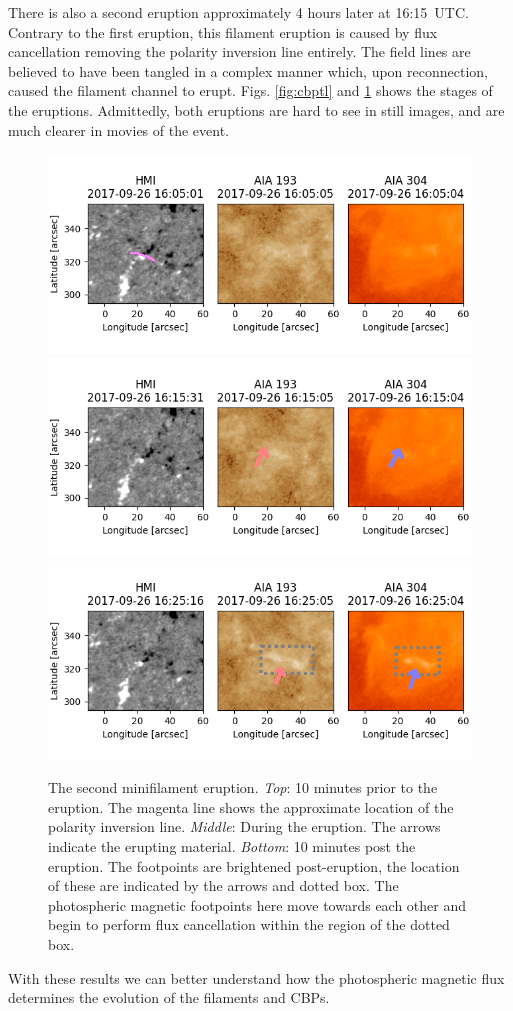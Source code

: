 There is also a second eruption approximately 4 hours later at 16:15~UTC. Contrary to the first eruption, this filament eruption is caused by flux cancellation removing the polarity inversion line entirely. The field lines are believed to have been tangled in a complex manner which, upon reconnection, caused the filament channel to erupt.  Figs. \ref{fig:cbptl} and \ref{fil2} shows the stages of the eruptions. Admittedly, both eruptions are hard to see in still images, and are much clearer in movies of the event.
\begin{figure}
    \centering
    \includegraphics[width=.8\linewidth]{./04CBPs/figs/before2.png}
    \includegraphics[width=.8\linewidth]{./04CBPs/figs/during2_overlay.png}
    \includegraphics[width=.8\linewidth]{./04CBPs/figs/after2_overlay.png}
    \caption[The second minifilament eruption.]{The second minifilament eruption. \textit{Top}: 10 minutes prior to the eruption. The magenta line shows the approximate location of the polarity inversion line. \textit{Middle}: During the eruption. The arrows indicate the erupting material. \textit{Bottom}: 10 minutes post the eruption. The footpoints are brightened post-eruption, the location of these are indicated by the arrows and dotted box. The photospheric magnetic footpoints here move towards each other and begin to perform flux cancellation within the region of the dotted box.}
    \label{fil2}
\end{figure}
With these results we can better understand how the photospheric magnetic flux determines the evolution of the filaments and CBPs.


